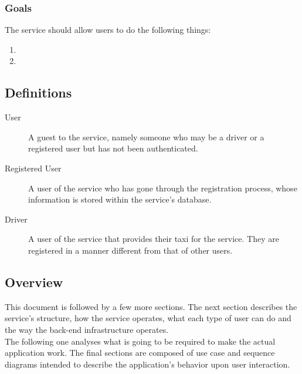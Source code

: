 	\subsubsection{Goals}
		The service should allow users to do the following things:
		\begin{enumerate}
		\item 
		\item 
		\end{enumerate}
			
\subsection{Definitions}
	\begin{description}
		\item[User]
			A guest to the service, namely someone who may be a driver or a registered user but has not been authenticated.
		\item[Registered User]
			A user of the service who has gone through the registration process, whose information is stored within the service's database.
		\item[Driver]
			A user of the service that provides their taxi for the service. They are registered in a manner different from that of other users.
	\end{description}
\subsection{Overview}
	This document is followed by a few more sections.
	The next section describes the service's structure, how the service operates, what each type of user can do and the way the
	back-end infrastructure operates. \\
	The following one analyses what is going to be required to make the actual application work.
	The final sections are composed of  use case and sequence diagrams intended to describe the application's behavior upon user
	interaction.

